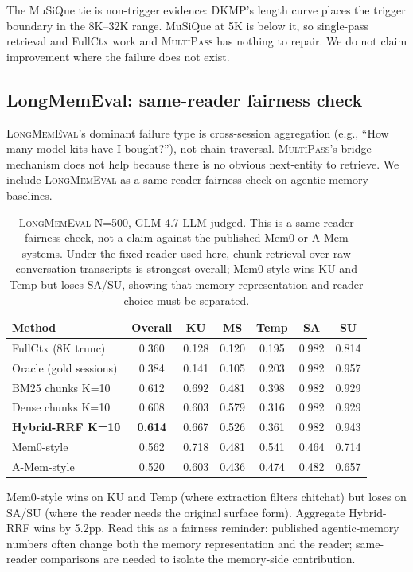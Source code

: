 \documentclass{article}
\theoremstyle{plain}
\theoremstyle{definition}
\newcommand{\ours}{\textsc{MultiPass}}
\newcommand{\dkmp}{\textsc{DKMP}}
\newcommand{\lm}{\textsc{LongMemEval}}
\begin{document}
The MuSiQue tie is non-trigger evidence: \dkmp{}'s length curve places
the trigger boundary in the 8K--32K range. MuSiQue at 5K is below it,
so single-pass retrieval and FullCtx work and \ours{} has nothing to
repair. We do not claim improvement where the failure does not exist.

\subsection{LongMemEval: same-reader fairness check}\label{sec:longmemeval}

\lm{}'s dominant failure type is cross-session aggregation (e.g., ``How
many model kits have I bought?''), not chain traversal. \ours{}'s bridge
mechanism does not help because there is no obvious next-entity to
retrieve. We include \lm{} as a same-reader fairness check on
agentic-memory baselines.

\begin{table}[t]
\centering
\caption{\lm{} N=500, GLM-4.7 LLM-judged. This is a same-reader fairness
check, not a claim against the published Mem0 or A-Mem systems. Under the
fixed reader used here, chunk retrieval over raw conversation transcripts
is strongest overall; Mem0-style wins KU and Temp but loses SA/SU, showing
that memory representation and reader choice must be separated.}
\label{tab:longmemeval}
\small
\begin{tabular*}{\textwidth}{@{\extracolsep{\fill}}lcccccc@{}}
\toprule
Method & Overall & KU & MS & Temp & SA & SU \\
\midrule
FullCtx (8K trunc) & 0.360 & 0.128 & 0.120 & 0.195 & 0.982 & 0.814 \\
Oracle (gold sessions) & 0.384 & 0.141 & 0.105 & 0.203 & 0.982 & 0.957 \\
BM25 chunks K=10 & 0.612 & 0.692 & 0.481 & 0.398 & 0.982 & 0.929 \\
Dense chunks K=10 & 0.608 & 0.603 & 0.579 & 0.316 & 0.982 & 0.929 \\
\textbf{Hybrid-RRF K=10} & \textbf{0.614} & 0.667 & 0.526 & 0.361 & 0.982 & 0.943 \\
Mem0-style & 0.562 & 0.718 & 0.481 & 0.541 & 0.464 & 0.714 \\
A-Mem-style & 0.520 & 0.603 & 0.436 & 0.474 & 0.482 & 0.657 \\
\bottomrule
\end{tabular*}
\end{table}

Mem0-style wins on KU and Temp (where extraction filters chitchat) but
loses on SA/SU (where the reader needs the original surface form).
Aggregate Hybrid-RRF wins by 5.2pp. Read this as a fairness reminder:
published agentic-memory numbers often change both the memory
representation and the reader; same-reader comparisons are needed to
isolate the memory-side contribution.
\end{document}
